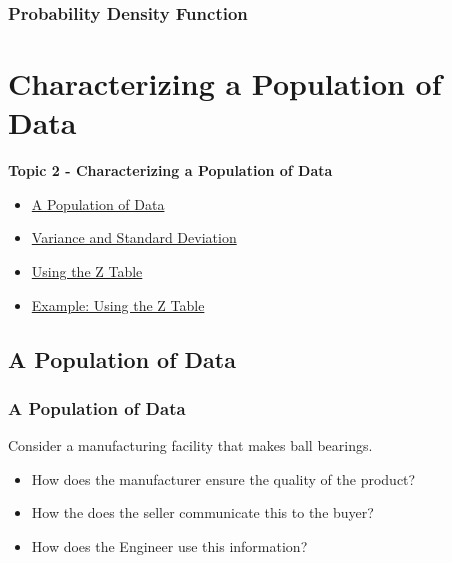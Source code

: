 \documentclass[fleqn]{beamer} %
\newcommand{\sectionIItitle}{Characterizing a Population of Data}
\newcommand{\sectionIsubsectionIVtitle}{Probability Density Function}
\newcommand{\sectionIIsubsectionItitle}{A Population of Data}
\newcommand{\sectionIIsubsectionIItitle}{Variance and Standard Deviation}
\newcommand{\sectionIIsubsectionIIItitle}{Using the Z Table}
\newcommand{\sectionIIsubsectionIVtitle}{Example: Using the Z Table}
\begin{document}
			\begin{frame}
				\frametitle{\sectionIsubsectionIVtitle}

\bigskip


			\end{frame}

	
	\section{\sectionIItitle}\label{sectionII}

		\begin{frame}
			\large \textbf{Topic 2 - \sectionIItitle} \vspace{3mm}\\

			\begin{itemize}
				\item \hyperlink{sectionIIsubsectionI}{\sectionIIsubsectionItitle} \vspc %
				\item \hyperlink{sectionIIsubsectionII}{\sectionIIsubsectionIItitle} \vspc %
				\item \hyperlink{sectionIIsubsectionIII}{\sectionIIsubsectionIIItitle} \vspc %
				\item \hyperlink{sectionIIsubsectionIV}{\sectionIIsubsectionIVtitle} \vspc %
			\end{itemize}

		\end{frame}

		\subsection{\sectionIIsubsectionItitle}\label{sectionIIsubsectionI}

			\begin{frame}[label=sectionIIsubsectionI]
				\frametitle{\sectionIIsubsectionItitle}

				Consider a manufacturing facility that makes ball bearings. 
				\begin{itemize}		
					\item How does the manufacturer ensure the quality of the product?
					\item How the does the seller communicate this to the buyer?
					\item How does the Engineer use this information? 
				\end{itemize}

			\end{frame}
\end{document}
